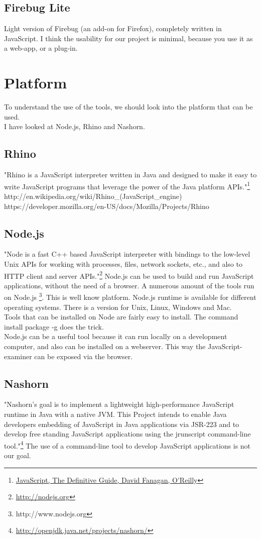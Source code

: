 \documentclass{article}
\begin{document}
\subsection {Firebug Lite}
Light version of Firebug (an add-on for Firefox), completely written in JavaScript.
I think the usability for our project is minimal, because you use it as a web-app, or a plug-in.

\section{Platform}
To understand the use of the tools, we should look into the platform that can be used.\\
I have looked at Node.js, Rhino and Nashorn.

\subsection{Rhino}
"Rhino is a JavaScript interpreter written in Java and designed to make it easy to write JavaScript programs 
that leverage the power of the Java platform APIs."\footnote{\url{JavaScript, The Definitive Guide, David Fanagan, O'Reilly}}\newline
http://en.wikipedia.org/wiki/Rhino\_(JavaScript\_engine)
https://developer.mozilla.org/en-US/docs/Mozilla/Projects/Rhino

\subsection{Node.js}
"Node is a fast C++ based JavaScript interpreter with bindings to the low-level 
Unix APIs for working with processes, files, network sockets, etc., and also to 
HTTP client and server APIs."\footnote{\url{http://nodejs.org}}
Node.js can be used to build and run JavaScript applications, without the need of a browser.
A numerous amount of the tools run on Node.js \footnote{http://www.nodejs.org}. This is well know platform.
Node.js runtime is available for different operating systems.
There is a version for Unix, Linux, Windows and Mac.\\
Tools that can be installed on Node are fairly easy to install. The command install package -g does the trick.\\
Node.js can be a useful tool because it can run locally on a development computer, and also can be installed on a webserver.
This way the JavaScript-examiner can be exposed via the browser.

\subsection{Nashorn}
"Nashorn's goal is to implement a lightweight high-performance JavaScript runtime in Java with a native JVM.
This Project intends to enable Java developers embedding of JavaScript in Java applications via JSR-223 and to develop 
free standing JavaScript applications using the jrunscript command-line tool."\footnote{\url{http://openjdk.java.net/projects/nashorn/}}
The use of a command-line tool to develop JavaScript applications is not our goal.
\end{document}
